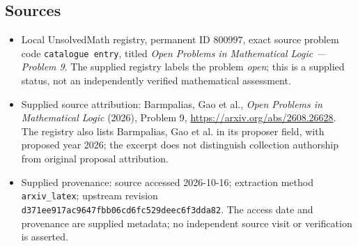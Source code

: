 \documentclass[11pt]{article}
\begin{document}
\subsection{Sources}
\begin{itemize}
\item Local UnsolvedMath registry, permanent ID \(800997\), exact source problem code \texttt{catalogue entry}, titled \emph{Open Problems in Mathematical Logic --- Problem 9}. The supplied registry labels the problem \emph{open}; this is a supplied status, not an independently verified mathematical assessment.
\item Supplied source attribution: Barmpalias, Gao et al., \emph{Open Problems in Mathematical Logic} (2026), Problem 9, \url{https://arxiv.org/abs/2608.26628}. The registry also lists Barmpalias, Gao et al. in its proposer field, with proposed year 2026; the excerpt does not distinguish collection authorship from original proposal attribution.
\item Supplied provenance: source accessed 2026-10-16; extraction method \texttt{arxiv\_latex}; upstream revision \texttt{d371ee917ac9647fbb06cd6fc529deec6f3dda82}. The access date and provenance are supplied metadata; no independent source visit or verification is asserted.
\end{itemize}
\end{document}
